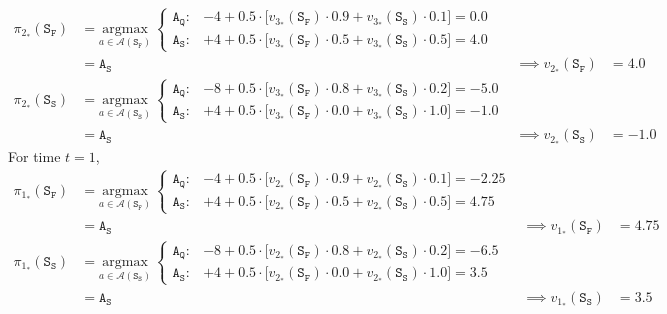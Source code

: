 \documentclass[11pt]{article}
\begin{document}
    \begin{align*}
        \pi_{2_{*}}(\texttt{S}_{\texttt{F}}) &= \underset{a \in \mathcal{A}(\texttt{S}_{\texttt{F}})}{\mathrm{argmax}} \
        \begin{cases}
            \texttt{A}_{\texttt{Q}}: & -4 + 0.5 \cdot \big[ v_{3_{*}}(\texttt{S}_{\texttt{F}}) \cdot 0.9 + v_{3_{*}}(\texttt{S}_{\texttt{S}}) \cdot 0.1 \big] = 0.0 \\
            \texttt{A}_{\texttt{S}}: & +4 + 0.5 \cdot \big[ v_{3_{*}}(\texttt{S}_{\texttt{F}}) \cdot 0.5 + v_{3_{*}}(\texttt{S}_{\texttt{S}}) \cdot 0.5 \big] = 4.0
        \end{cases} \\
        &= \texttt{A}_{\texttt{S}} & \implies v_{2_{*}}(\texttt{S}_{\texttt{F}}) &= 4.0 \\
        \pi_{2_{*}}(\texttt{S}_{\texttt{S}}) &= \underset{a \in \mathcal{A}(\texttt{S}_{\texttt{S}})}{\mathrm{argmax}} \
        \begin{cases}
            \texttt{A}_{\texttt{Q}}: & -8 + 0.5 \cdot \big[ v_{3_{*}}(\texttt{S}_{\texttt{F}}) \cdot 0.8 + v_{3_{*}}(\texttt{S}_{\texttt{S}}) \cdot 0.2 \big] = -5.0 \\
            \texttt{A}_{\texttt{S}}: & +4 + 0.5 \cdot \big[ v_{3_{*}}(\texttt{S}_{\texttt{F}}) \cdot 0.0 + v_{3_{*}}(\texttt{S}_{\texttt{S}}) \cdot 1.0 \big] = -1.0
        \end{cases} \\
        &= \texttt{A}_{\texttt{S}} & \implies v_{2_{*}}(\texttt{S}_{\texttt{S}}) &= -1.0
    \end{align*}
    For time $t = 1$,
    \begin{align*}
        \pi_{1_{*}}(\texttt{S}_{\texttt{F}}) &= \underset{a \in \mathcal{A}(\texttt{S}_{\texttt{F}})}{\mathrm{argmax}} \
        \begin{cases}
            \texttt{A}_{\texttt{Q}}: & -4 + 0.5 \cdot \big[ v_{2_{*}}(\texttt{S}_{\texttt{F}}) \cdot 0.9 + v_{2_{*}}(\texttt{S}_{\texttt{S}}) \cdot 0.1 \big] = -2.25 \\
            \texttt{A}_{\texttt{S}}: & +4 + 0.5 \cdot \big[ v_{2_{*}}(\texttt{S}_{\texttt{F}}) \cdot 0.5 + v_{2_{*}}(\texttt{S}_{\texttt{S}}) \cdot 0.5 \big] = 4.75
        \end{cases} \\
        &= \texttt{A}_{\texttt{S}} & \implies v_{1_{*}}(\texttt{S}_{\texttt{F}}) &= 4.75 \\
        \pi_{1_{*}}(\texttt{S}_{\texttt{S}}) &= \underset{a \in \mathcal{A}(\texttt{S}_{\texttt{S}})}{\mathrm{argmax}} \
        \begin{cases}
            \texttt{A}_{\texttt{Q}}: & -8 + 0.5 \cdot \big[ v_{2_{*}}(\texttt{S}_{\texttt{F}}) \cdot 0.8 + v_{2_{*}}(\texttt{S}_{\texttt{S}}) \cdot 0.2 \big] = -6.5 \\
            \texttt{A}_{\texttt{S}}: & +4 + 0.5 \cdot \big[ v_{2_{*}}(\texttt{S}_{\texttt{F}}) \cdot 0.0 + v_{2_{*}}(\texttt{S}_{\texttt{S}}) \cdot 1.0 \big] = 3.5
        \end{cases} \\
        &= \texttt{A}_{\texttt{S}} & \implies v_{1_{*}}(\texttt{S}_{\texttt{S}}) &= 3.5
    \end{align*}
\end{document}
